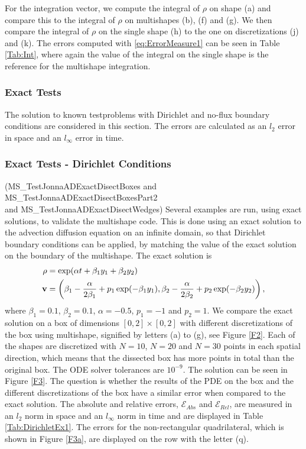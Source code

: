 For the integration vector, we compute the integral of $\rho$ on shape (a) and compare this to the integral of $\rho$ on multishapes (b), (f) and (g). We then compare the integral of $\rho$ on the single shape (h) to the one on discretizations (j) and (k). The errors computed with \eqref{eq:ErrorMeasure1} can be seen in Table \ref{Tab:Int}, where again the value of the integral on the single shape is the reference for the multishape integration.










\subsubsection{Exact Tests}
The solution to known testproblems with Dirichlet and no-flux boundary conditions are considered in this section. The errors are calculated as an $l_2$ error in space and an $l_\infty$ error in time.
\subsubsection*{Exact Tests - Dirichlet Conditions}
(MS\_TestJonnaADExactDisectBoxes and MS\_TestJonnaADExactDisectBoxesPart2\\ and MS\_TestJonnaADExactDisectWedges)
Several examples are run, using exact solutions, to validate the multishape code. This is done using an exact solution to the advection diffusion equation on an infinite domain, so that Dirichlet boundary conditions can be applied, by matching the value of the exact solution on the boundary of the multishape.
The exact solution is \cite{Hutomo_2019}
\begin{align}\label{eq:DirichletExactSol}
	\rho &= \exp(\alpha t + \beta_1 y_1 + \beta_2 y_2)\\
	\mathbf v &= \left(\beta_1 - \frac{\alpha}{2 \beta_1} + p_1\exp(-\beta_1 y_1) , \beta_2 - \frac{\alpha}{2 \beta_2} + p_2\exp(-\beta_2 y_2) \right),\notag
\end{align}
where $\beta_1 = 0.1$, $\beta_2 = 0.1$, $\alpha = -0.5$, $p_1 = -1$ and $p_2 = 1$.
We compare the exact solution on a box of dimensions $[0,2] \times [0,2] $ with different discretizations of the box using multishape, signified by letters (a) to (g), see Figure \ref{F2}. Each of the shapes are discretized with $N = 10$, $N = 20$ and $N = 30$ points in each spatial direction, which means that the dissected box has more points in total than the original box. The ODE solver tolerances are $10^{-9}$. The solution can be seen in Figure \ref{F3}. The question is whether the results of the PDE on the box and the different discretizations of the box have a similar error when compared to the exact solution. The absolute and relative errors, $\mathcal E_{Abs}$ and $\mathcal E_{Rel}$, are measured in an $l_2$ norm in space and an $l_\infty$ norm in time and are displayed in Table \ref{Tab:DirichletEx1}. The errors for the non-rectangular quadrilateral, which is shown in Figure \ref{F3a}, are displayed on the row with the letter (q). 


